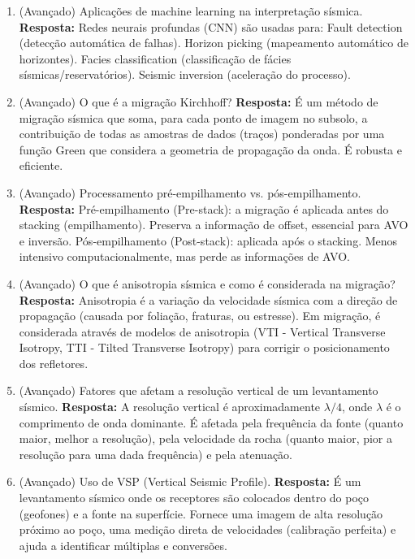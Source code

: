 \documentclass[11pt,a4paper]{article}
\begin{document}
\begin{enumerate}
  \item (Avançado) Aplicações de machine learning na interpretação sísmica.
  \textbf{Resposta:} Redes neurais profundas (CNN) são usadas para: Fault detection (detecção automática de falhas). Horizon picking (mapeamento automático de horizontes). Facies classification (classificação de fácies sísmicas/reservatórios). Seismic inversion (aceleração do processo).

  \item (Avançado) O que é a migração Kirchhoff?
  \textbf{Resposta:} É um método de migração sísmica que soma, para cada ponto de imagem no subsolo, a contribuição de todas as amostras de dados (traços) ponderadas por uma função Green que considera a geometria de propagação da onda. É robusta e eficiente.

  \item (Avançado) Processamento pré-empilhamento vs. pós-empilhamento.
  \textbf{Resposta:} Pré-empilhamento (Pre-stack): a migração é aplicada antes do stacking (empilhamento). Preserva a informação de offset, essencial para AVO e inversão. Pós-empilhamento (Post-stack): aplicada após o stacking. Menos intensivo computacionalmente, mas perde as informações de AVO.

  \item (Avançado) O que é anisotropia sísmica e como é considerada na migração?
  \textbf{Resposta:} Anisotropia é a variação da velocidade sísmica com a direção de propagação (causada por foliação, fraturas, ou estresse). Em migração, é considerada através de modelos de anisotropia (VTI - Vertical Transverse Isotropy, TTI - Tilted Transverse Isotropy) para corrigir o posicionamento dos refletores.

  \item (Avançado) Fatores que afetam a resolução vertical de um levantamento sísmico.
  \textbf{Resposta:} A resolução vertical é aproximadamente $\lambda/4$, onde $\lambda$ é o comprimento de onda dominante. É afetada pela frequência da fonte (quanto maior, melhor a resolução), pela velocidade da rocha (quanto maior, pior a resolução para uma dada frequência) e pela atenuação.

  \item (Avançado) Uso de VSP (Vertical Seismic Profile).
  \textbf{Resposta:} É um levantamento sísmico onde os receptores são colocados dentro do poço (geofones) e a fonte na superfície. Fornece uma imagem de alta resolução próximo ao poço, uma medição direta de velocidades (calibração perfeita) e ajuda a identificar múltiplas e conversões.


\end{enumerate}
\end{document}
